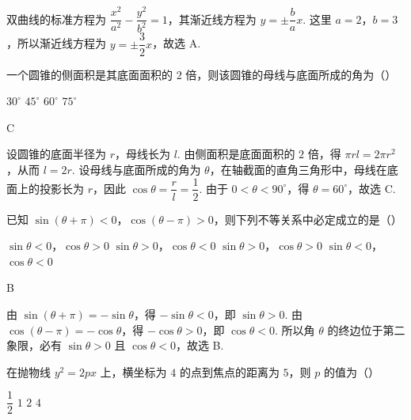 \begin{solution}
双曲线的标准方程为 \(\dfrac{x^{2}}{a^{2}}-\dfrac{y^{2}}{b^{2}}=1\)，其渐近线方程为 \(y=\pm\dfrac{b}{a}x\). 这里 \(a=2\)，\(b=3\)，所以渐近线方程为 \(y=\pm\dfrac{3}{2}x\)，故选 A.
\end{solution}


\begin{problem}
一个圆锥的侧面积是其底面面积的 \(2\) 倍，则该圆锥的母线与底面所成的角为（\quad）

\choices
    {\(30^{\circ}\)}
    {\(45^{\circ}\)}
    {\(60^{\circ}\)}
    {\(75^{\circ}\)}
\end{problem}

\begin{answer}
C
\end{answer}

\begin{solution}
设圆锥的底面半径为 \(r\)，母线长为 \(l\). 由侧面积是底面面积的 \(2\) 倍，得 \(\pi rl=2\pi r^{2}\)，从而 \(l=2r\). 设母线与底面所成的角为 \(\theta\)，在轴截面的直角三角形中，母线在底面上的投影长为 \(r\)，因此 \(\cos\theta=\dfrac{r}{l}=\dfrac{1}{2}\). 由于 \(0<\theta<90^{\circ}\)，得 \(\theta=60^{\circ}\)，故选 C.
\end{solution}


\begin{problem}
已知 \(\sin(\theta+\pi)<0\)，\(\cos(\theta-\pi)>0\)，则下列不等关系中必定成立的是（\quad）

\choices
    {\(\sin\theta<0\)，\(\cos\theta>0\)}
    {\(\sin\theta>0\)，\(\cos\theta<0\)}
    {\(\sin\theta>0\)，\(\cos\theta>0\)}
    {\(\sin\theta<0\)，\(\cos\theta<0\)}
\end{problem}

\begin{answer}
B
\end{answer}

\begin{solution}
由 \(\sin(\theta+\pi)=-\sin\theta\)，得 \(-\sin\theta<0\)，即 \(\sin\theta>0\). 由 \(\cos(\theta-\pi)=-\cos\theta\)，得 \(-\cos\theta>0\)，即 \(\cos\theta<0\). 所以角 \(\theta\) 的终边位于第二象限，必有 \(\sin\theta>0\) 且 \(\cos\theta<0\)，故选 B.
\end{solution}


\begin{problem}
在抛物线 \(y^{2}=2px\) 上，横坐标为 \(4\) 的点到焦点的距离为 \(5\)，则 \(p\) 的值为（\quad）

\choices
    {\(\dfrac{1}{2}\)}
    {\(1\)}
    {\(2\)}
    {\(4\)}
\end{problem}

